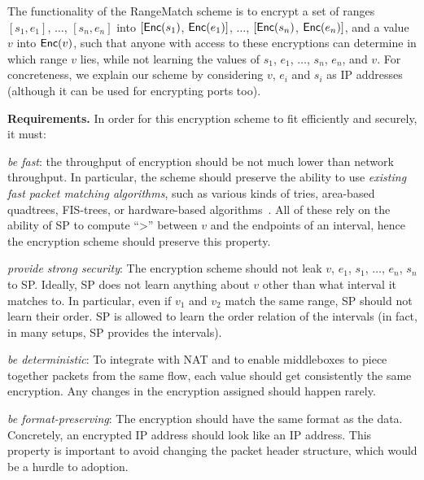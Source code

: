 %
The functionality of the RangeMatch scheme is to encrypt a set of ranges $[s_1, e_1]$, $\dots$, $[s_n, e_n]$ into  $[\mathsf{Enc}(s_1)$, $\mathsf{Enc}(e_1)]$, $\dots$, $[\mathsf{Enc}(s_n)$,  $\mathsf{Enc}(e_n)]$, and a value $v$ into $\mathsf{Enc}(v)$, such that anyone with access to these encryptions can determine in which range $v$ lies, while not learning the values of $s_1$, $e_1$, $\dots$, $s_n$, $e_n$, and $v$. 
For concreteness, we explain our scheme by considering $v$, $e_i$ and $s_i$ as IP addresses (although it can be used for encrypting ports too).

\noindent\textbf{Requirements.}
%
In order for this encryption scheme to fit \sys efficiently and securely, it must:

\begin{CompactEnumerate}[leftmargin=*]

\item  {\em be fast}: the throughput of encryption should be not much lower than network throughput. In particular, the scheme should preserve the ability to use {\em existing fast packet matching algorithms}, such as  various kinds of tries, area-based quadtrees, FIS-trees, or hardware-based algorithms~\cite{packet_classif}.  All of these rely on the ability of SP  to compute ``>'' between $v$ and the endpoints of an interval,
hence the encryption scheme should preserve this property. 




\item {\em provide strong security}: The encryption scheme should not leak $v$, $e_1$, $s_1$, $\dots$, $e_n$, $s_n$ to SP.
Ideally, SP does not learn anything about $v$ other than what interval it matches to. In  particular, even if $v_1$ and $v_2$ match the same range, SP should not learn their order. SP is allowed to learn the order relation of the intervals (in fact, in many setups, SP provides the intervals). \label{req:sec}


\item {\em be deterministic}: To integrate with NAT and to enable middleboxes to piece together packets from the same flow, each value should get  consistently  the same encryption. Any changes in the encryption assigned should happen rarely.  \label{req:injective}

\item {\em be format-preserving}: The encryption should have the same format as the data. Concretely, an encrypted IP address should look like an IP address.  This property is important to avoid changing the packet header structure, which would be a hurdle to adoption. 
 \end{CompactEnumerate}


